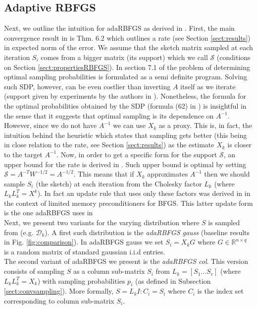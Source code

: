 \documentclass[12pt,conference,compsocconf]{IEEEtran}
\newcommand{\R}{\mathbb{R}}
\begin{document}
\subsection{Adaptive RBFGS}\label{sect:adadef}
Next, we outline the intuition for adaRBFGS as derived in \cite{Gower1}. First, the main convergence result in \cite{Gower1} is Thm. 6.2 which outlines a rate (see Section \ref{sect:results}) in expected norm of the error. We assume that the sketch matrix sampled at each iteration $S_i$ comes from a bigger matrix (its support) which we call $\mathcal{S}$ (conditions on Section \ref{sect:propertiesRBFGS}). In section 7.1 of \cite{Gower1} the problem of determining optimal sampling probabilities is formulated as a semi definite program. Solving such SDP, however, can be even costlier than inverting $A$ itself as we iterate (support given by experiments by the authors in \cite{Gower1}). Nonetheless, the formula for the optimal probabilities obtained by the SDP (formula (62) in \cite{Gower1}) is insightful in the sense that it suggests that optimal sampling is its dependence on $A^{-1}$. However, since we do not have $A^{-1}$ we can use $X_k$ as a proxy. This is, in fact, the intuition behind the heuristic which states that sampling gets better (this being in close relation to the rate, see Section \ref{sect:results}) as the estimate $X_k$ is closer to the target $A^{-1}$. Now, in order to get a specific form for the support $\mathcal{S}$, an upper bound for the rate is derived in \cite{Gower2}. Such upper bound is optimal by setting $\mathcal{S}=A^{-T}W^{-1/2}=A^{-1/2}$. This means that if $X_k$ approximates $A^{-1}$ then we should sample $S_i$ (the sketch) at each iteration from the Cholesky factor $L_k$ (where $L_kL_k^T=X^k$). In fact an update rule that uses only these factors was derived in \cite{Gratton} in the context of limited memory preconditioners for BFGS. This latter update form is the one adaRBFGS uses in \cite{Gower1}\\
Next, we present two variants for the varying distribution where $S$ is sampled from (e.g. $\mathcal{D}_k$). A first such distribution is the \textit{adaRBFGS gauss} (baseline results in Fig. \ref{fig:comparison}). In adaRBFGS gauss we set $S_i=X_kG$ where $G \in \R^{n\times q}$ is a random matrix of standard gaussian i.i.d entries.\\
The second variant of adaRBFGS we present is the \textit{adaRBFGS col}. This version consists of sampling $S$ as a column sub-matrix $S_i$ from $L_k=[S_1\ldots S_r]$ (where $L_kL_k^T=X_k$) with sampling probabilities $p_i$ (as defined in Subsection \ref{sect:convsampling}). More formally, $S=L_kI{:C_i}=S_i$ where $C_i$ is the index set corresponding to column sub-matrix $S_i$.
\end{document}
